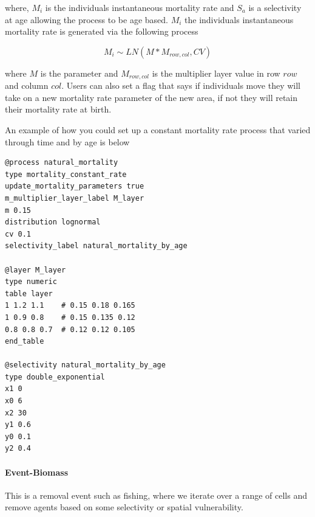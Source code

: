 where, $M_i$ is the individuals instantaneous mortality rate and $S_a$ is a selectivity at age allowing the process to be age based. $M_i$ the individuals instantaneous mortality rate is generated via the following process

\begin{equation}\label{constan_mort_assign}
M_i \sim LN(M * M_{row,col}, CV)
\end{equation}

where $M$ is the parameter  and $M_{row,col}$ is the multiplier layer value in row $row$ and column $col$. Users can also set a flag that says if individuals move they will take on a new mortality rate parameter of the new area, if not they will retain their mortality rate at birth.

An example of how you could set up a constant mortality rate process that varied through time and by age is below

{\small{\begin{verbatim}
@process natural_mortality
type mortality_constant_rate
update_mortality_parameters true
m_multiplier_layer_label M_layer
m 0.15
distribution lognormal
cv 0.1
selectivity_label natural_mortality_by_age

@layer M_layer
type numeric
table layer
1 1.2 1.1    # 0.15 0.18 0.165
1 0.9 0.8    # 0.15 0.135 0.12
0.8 0.8 0.7  # 0.12 0.12 0.105
end_table

@selectivity natural_mortality_by_age
type double_exponential
x1 0
x0 6
x2 30
y1 0.6
y0 0.1
y2 0.4
\end{verbatim}}}

\paragraph{Event-Biomass}
This is a removal event such as fishing, where we iterate over a range of cells and remove agents based on some selectivity or spatial vulnerability.

\subsubsection{}
